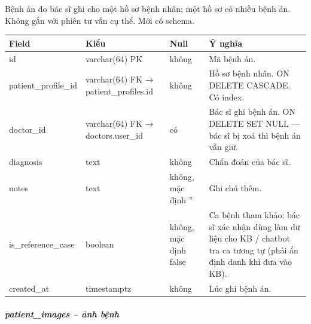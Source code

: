 Bệnh án do bác sĩ ghi cho một hồ sơ bệnh nhân; một hồ sơ có nhiều bệnh án. Không gắn với phiên tư vấn cụ thể. Mới có schema.
\begin{longtable}{|>{\raggedright\arraybackslash}p{0.250\dimexpr\linewidth-8\tabcolsep\relax}|>{\raggedright\arraybackslash}p{0.250\dimexpr\linewidth-8\tabcolsep\relax}|>{\raggedright\arraybackslash}p{0.250\dimexpr\linewidth-8\tabcolsep\relax}|>{\raggedright\arraybackslash}p{0.250\dimexpr\linewidth-8\tabcolsep\relax}|}
\hline
\textbf{Field} & \textbf{Kiểu} & \textbf{Null} & \textbf{Ý nghĩa} \\ \hline
\endhead
id & varchar(64) PK & không & Mã bệnh án. \\ \hline
patient\_profile\_id & varchar(64) FK → patient\_profiles.id & không & Hồ sơ bệnh nhân. ON DELETE CASCADE. Có index. \\ \hline
doctor\_id & varchar(64) FK → doctors.user\_id & có & Bác sĩ ghi bệnh án. ON DELETE SET NULL --- bác sĩ bị xoá thì bệnh án vẫn giữ. \\ \hline
diagnosis & text & không & Chẩn đoán của bác sĩ. \\ \hline
notes & text & không, mặc định '' & Ghi chú thêm. \\ \hline
is\_reference\_case & boolean & không, mặc định false & Ca bệnh tham khảo: bác sĩ xác nhận dùng làm dữ liệu cho KB / chatbot tra ca tương tự (phải ẩn định danh khi đưa vào KB). \\ \hline
created\_at & timestamptz & không & Lúc ghi bệnh án. \\ \hline
\end{longtable}

\subparagraph{patient\_images -- ảnh bệnh}

